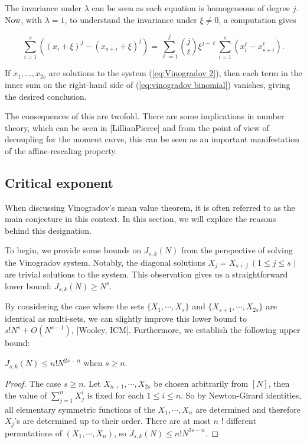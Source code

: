 The invariance under \(\lambda\) can be seen as each equation is homogeneous of degree \(j\). Now, with \(\lambda = 1\), to understand the invariance under \(\xi \neq 0\), a computation gives

\begin{equation}\label{eq:vinogradov binomial}
\sum_{i=1}^{s}\left(\left(x_{i} + \xi\right)^{j} - \left(x_{s+i} + \xi\right)^{j}\right) = \sum_{\ell=1}^{j} \binom{j}{\ell} \xi^{j-\ell} \sum_{i=1}^{s} \left(x_{i}^{\ell} - x_{s+i}^{\ell}\right).
\end{equation}

If \(x_{1}, \ldots, x_{2s}\) are solutions to the system (\ref{eq:Vinogradov 2}), then each term in the inner sum on the right-hand side of (\ref{eq:vinogradov binomial}) vanishes, giving the desired conclusion.

The consequences of this are twofold. There are some implications in number theory, which can be seen in [LillianPierce] and from the point of view of decoupling for the moment curve, this can be seen as an important manifestation of the affine-rescaling property.
\subsection{Critical exponent}
When discussing Vinogradov's mean value theorem, it is often referred to as the main conjecture in this context. In this section, we will explore the reasons behind this designation.

To begin, we provide some bounds on \(J_{s, k}(N)\) from the perspective of solving the Vinogradov system. Notably, the diagonal solutions \(X_{j} = X_{s+j} \ (1 \leq j \leq s)\) are trivial solutions to the system. This observation gives us a straightforward lower bound: \(J_{s, k}(N) \geq N^{s}\). 

By considering the case where the sets \(\{X_{1}, \cdots, X_{s}\}\) and \(\{X_{s+1}, \cdots, X_{2s}\}\) are identical as multi-sets, we can slightly improve this lower bound to \(s!N^{s} + O(N^{s-1})\), [Wooley, ICM]. Furthermore, we establish the following upper bound:
\begin{lem}\label{lem:1st non trivial case}
     $J_{s, k}(N) \leq n!N^{2 s-n}$ when $s \geq n$.
\end{lem}
\begin{proof}
     The case $s \geq n$. Let $X_{n+1}, \cdots, X_{2 s}$ be chosen arbitrarily from $[N]$, then the value of $\sum_{j=1}^{n} X_{j}^{i}$ is fixed for each $1 \leq i \leq n$. So by Newton-Girard identities, all elementary symmetric functions of the $X_{1}, \cdots, X_{n}$ are determined and therefore $X_{j}$'s are determined up to their order. There are at most $n$ ! different permutations of $\left(X_{1}, \cdots, X_{n}\right)$, so $J_{s, k}(N) \leq n!N^{2 s-n}$.
\end{proof}

